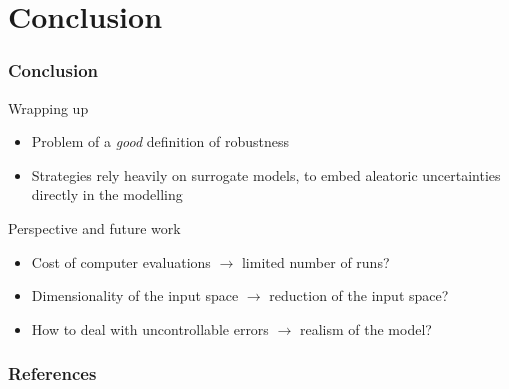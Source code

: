 \documentclass[11pt]{beamer}
\begin{document}
\section{Conclusion}
\begin{frame}
 \frametitle{Conclusion}
\begin{block}{Wrapping up}
\begin{itemize}
\item Problem of a \emph{good} definition of robustness
\item Strategies rely heavily on surrogate models, to embed aleatoric uncertainties directly in the modelling
\end{itemize}
\end{block}


\begin{block}{Perspective and future work}
\begin{itemize}
\item Cost of computer evaluations $\rightarrow$ limited number of runs?
\item Dimensionality of the input space $\rightarrow$ reduction of the input space?
\item How to deal with uncontrollable errors $\rightarrow$ realism of the model?
\end{itemize}
\end{block}
\end{frame}
\begin{frame}[shrink=1%
  ]
  \frametitle{References}


\end{frame}
\end{document}
